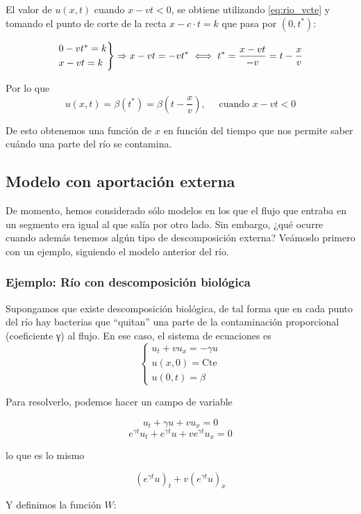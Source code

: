 		El valor de $u(x,t)$ cuando $x-vt < 0$, se obtiene utilizando \ref{eq:rio_vcte} y tomando el punto de corte de la recta $x-c \cdot t=k$ que pasa por $(0,t^*)$:

		$$
		\begin{rcases}
			0 - vt^{*} = k \\
			x - vt = k
		\end{rcases}
		 \Rightarrow x-vt = -vt^{*} \iff t^* = \frac{x-vt}{-v} = t - \frac{x}{v}$$

		Por lo que
		$$u(x,t) = \beta(t^*) = \beta(t - \frac{x}{v}), \quad \text{ cuando } x - vt < 0$$

		De esto obtenemos una función de $x$ en función del tiempo que nos permite saber cuándo una parte del río se contamina.

	\subsection{Modelo con aportación externa}

	De momento, hemos considerado sólo modelos en los que el flujo que entraba en un segmento era igual al que salía por otro lado. Sin embargo, ¿qué ocurre cuando además tenemos algún tipo de descomposición externa? Veámoslo primero con un ejemplo, siguiendo el modelo anterior del río.

	\subsubsection{Ejemplo: Río con descomposición biológica}

		Supongamos que existe descomposición biológica, de tal forma que en cada punto del río hay bacterias que ``quitan'' una parte de la contaminación proporcional (coeficiente γ) al flujo. En ese caso, el sistema de ecuaciones es \[
		\begin{cases}
		u_t + vu_x = -\gamma u \\
		u(x,0) = \text{Cte} \\
		u(0,t) = \beta
		\end{cases} \]

		Para resolverlo, podemos hacer un campo de variable

		$$u_t + \gamma u + vu_x = 0$$
		$$e^{\gamma t} u_t + e^{\gamma t} u + v e^{ \gamma t} u_x = 0 $$

		lo que es lo mismo

		$$(e^{\gamma t}u)_t + v (e^{\gamma t} u)_x$$

		Y definimos la función $W$:

